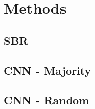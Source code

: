 \section{Methods}
\label{sec:methods}

\subsection{SBR}
\label{subsec:sbr}


\subsection{CNN - Majority}
\label{subsec:cnn_majority}


\subsection{CNN - Random}
\label{subsec:cnn_random}

